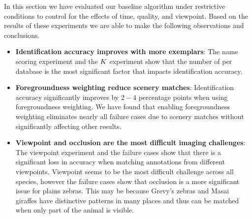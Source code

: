         In this section we have evaluated our baseline algorithm under
          restrictive conditions to control for the effects of time,
          quality, and viewpoint.
        Based on the results of these experiments we are able to make
          the following observations and conclusions.
        \begin{itemize}

            \item \textbf{Identification accuracy improves with more exemplars}:
            The name scoring experiment and the $K$ experiment show
              that the number of \exemplars{} per database \name{} is the
              most significant factor that impacts identification
              accuracy.

            \item \textbf{Foregroundness weighting reduce scenery matches}:
            Identification accuracy significantly improves by $2-4$
              percentage points when using foregroundness weighting.
            We have found that enabling foregroundness weighting
              eliminates nearly all failure cases due to scenery matches
              without significantly affecting other results.

            \item \textbf{Viewpoint and occlusion are the most difficult imaging challenges}:
            The viewpoint experiment and the failure cases show that
              there is a significant loss in accuracy when matching
              annotations from different viewpoints.
            Viewpoint seems to be the most difficult challenge across
              all species, however the failure cases show that occlusion
              is a more significant issue for plains zebras.
            This may be because Grevy's zebras and Masai giraffes have
              distinctive patterns in many places and thus can be matched
              when only part of the animal is visible.


\end{itemize}
